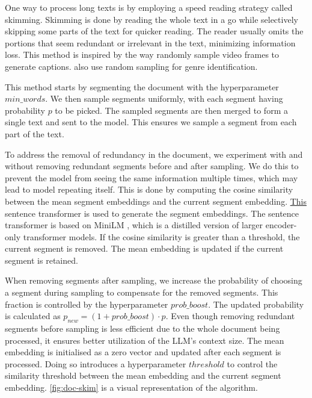		One way to process long texts is by employing a speed reading strategy called skimming.
		Skimming is done by reading the whole text in a go while selectively skipping some parts of the
		text for quicker reading.
		The reader usually omits the portions that seem redundant or irrelevant in the text, minimizing
		information loss.
		This method is inspired by the way \citet{wang2024videoagent} randomly sample video frames to
		generate captions.
		\citet{worsham-kalita-2018-genre} also use random sampling for genre identification.

		This method starts by segmenting the document with the hyperparameter $min\_words$.
		We then sample segments uniformly, with each segment having probability $p$ to be picked.
		The sampled segments are then merged to form a single text and sent to the model.
		This ensures we sample a segment from each part of the text.

		To address the removal of redundancy in the document, we experiment with and without removing
		redundant segments before and after sampling.
		We do this to prevent the model from seeing the same information multiple times, which may
		lead to model repeating itself.
		This is done by computing the cosine similarity between the mean segment embeddings and the
		current segment embedding.
		\href{https://huggingface.co/sentence-transformers/all-MiniLM-L6-v2}{This} sentence transformer
		is used to generate the segment embeddings.
		The sentence transformer is based on MiniLM \cite{wang2020minilm}, which is a distilled version
		of larger encoder-only transformer models.
		If the cosine similarity is greater than a threshold, the current segment is removed.
		The mean embedding is updated if the current segment is retained.

		When removing segments after sampling, we increase the probability of choosing a segment during
		sampling to compensate for the removed segments.
		This fraction is controlled by the hyperparameter $prob\_boost$.
		The updated probability is calculated as $p_{new} = (1 + prob\_boost) \cdot p$.
		Even though removing redundant segments before sampling is less efficient due to the whole document
		being processed, it ensures better utilization of the LLM's context size.
		The mean embedding is initialised as a zero vector and updated after each segment is processed.
		Doing so introduces a hyperparameter $threshold$ to control the similarity threshold between the
		mean embedding and the current segment embedding.
		\autoref{fig:doc-skim} is a visual representation of the algorithm.


